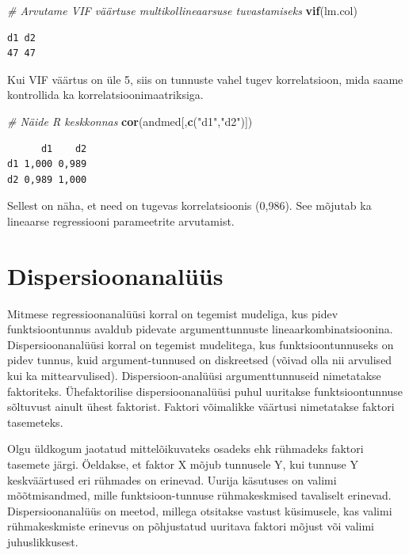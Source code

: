 \documentclass[
]{book}
\newenvironment{Shaded}{\begin{snugshade}}{\end{snugshade}}
\newcommand{\CommentTok}[1]{\textcolor[rgb]{0.56,0.35,0.01}{\textit{#1}}}
\newcommand{\FunctionTok}[1]{\textcolor[rgb]{0.13,0.29,0.53}{\textbf{#1}}}
\newcommand{\NormalTok}[1]{#1}
\newcommand{\StringTok}[1]{\textcolor[rgb]{0.31,0.60,0.02}{#1}}
\renewenvironment{Shaded} {\begin{snugshade}\footnotesize} {\end{snugshade}}
\begin{document}
\begin{Shaded}
\begin{Highlighting}[]
\CommentTok{\# Arvutame VIF väärtuse multikollineaarsuse tuvastamiseks}
\FunctionTok{vif}\NormalTok{(lm.col)}
\end{Highlighting}
\end{Shaded}

\begin{verbatim}
d1 d2 
47 47 
\end{verbatim}

Kui VIF väärtus on üle 5, siis on tunnuste vahel tugev korrelatsioon, mida saame kontrollida ka korrelatsioonimaatriksiga.

\begin{Shaded}
\begin{Highlighting}[]
\CommentTok{\# Näide R keskkonnas}
\FunctionTok{cor}\NormalTok{(andmed[,}\FunctionTok{c}\NormalTok{(}\StringTok{"d1"}\NormalTok{,}\StringTok{"d2"}\NormalTok{)])}
\end{Highlighting}
\end{Shaded}

\begin{verbatim}
      d1    d2
d1 1,000 0,989
d2 0,989 1,000
\end{verbatim}

Sellest on näha, et need on tugevas korrelatsioonis (0,986). See mõjutab ka lineaarse regressiooni parameetrite arvutamist.

\section{Dispersioonanalüüs}\label{dispersioonanaluxfcuxfcs}

Mitmese regressioonanalüüsi korral on tegemist mudeliga, kus pidev funktsioontunnus avaldub pidevate argumenttunnuste lineaarkombinatsioonina. Dispersioonanalüüsi korral on tegemist mudelitega, kus funktsioontunnuseks on pidev tunnus, kuid argument-tunnused on diskreetsed (võivad olla nii arvulised kui ka mittearvulised). Dispersioon-analüüsi argumenttunnuseid nimetatakse faktoriteks. Ühefaktorilise dispersioonanalüüsi puhul uuritakse funktsioontunnuse sõltuvust ainult ühest faktorist. Faktori võimalikke väärtusi nimetatakse faktori tasemeteks.

Olgu üldkogum jaotatud mittelõikuvateks osadeks ehk rühmadeks faktori tasemete järgi. Öeldakse, et faktor X mõjub tunnusele Y, kui tunnuse Y keskväärtused eri rühmades on erinevad. Uurija käsutuses on valimi mõõtmisandmed, mille funktsioon-tunnuse rühmakeskmised tavaliselt erinevad. Dispersioonanalüüs on meetod, millega otsitakse vastust küsimusele, kas valimi rühmakeskmiste erinevus on põhjustatud uuritava faktori mõjust või valimi juhuslikkusest.
\end{document}
